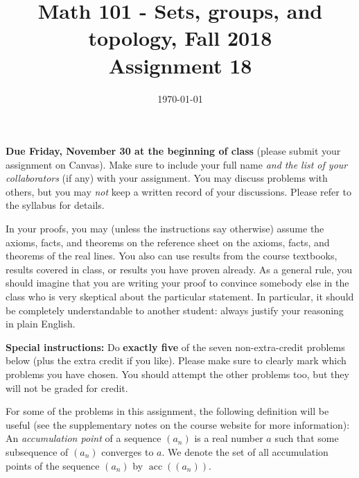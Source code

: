 \documentclass{amsart}
\title[Math 101, Fall 2018: assignment 18]{Math 101 - Sets, groups, and topology, Fall 2018 \\ Assignment 18}
\date{\today}
\theoremstyle{definition}
\newcommand{\acc}{\operatorname{acc}}
\begin{document}

\maketitle

\textbf{Due Friday, November 30 at the beginning of class} (please submit your assignment on Canvas). Make sure to include your full name \emph{and the list of your collaborators} (if any) with your assignment. You may discuss problems with others, but you may \emph{not} keep a written record of your discussions. Please refer to the syllabus for details.

In your proofs, you may (unless the instructions say otherwise) assume the axioms, facts, and theorems on the reference sheet on the axioms, facts, and theorems of the real lines. You also can use results from the course textbooks, results covered in class, or results you have proven already. As a general rule, you should imagine that you are writing your proof to convince somebody else in the class who is very skeptical about the particular statement. In particular, it should be completely understandable to another student: always justify your reasoning in plain English.

\textbf{Special instructions:} Do \textbf{exactly five} of the seven non-extra-credit problems below (plus the extra credit if you like). Please make sure to clearly mark which problems you have chosen. You should attempt the other problems too, but they will not be graded for credit.

For some of the problems in this assignment, the following definition will be useful (see the supplementary notes on the course website for more information): An \emph{accumulation point} of a sequence $(a_n)$ is a real number $a$ such that some subsequence of $(a_n)$ converges to $a$. We denote the set of all accumulation points of the sequence $(a_n)$ by $\acc ((a_n))$.
\end{document}
